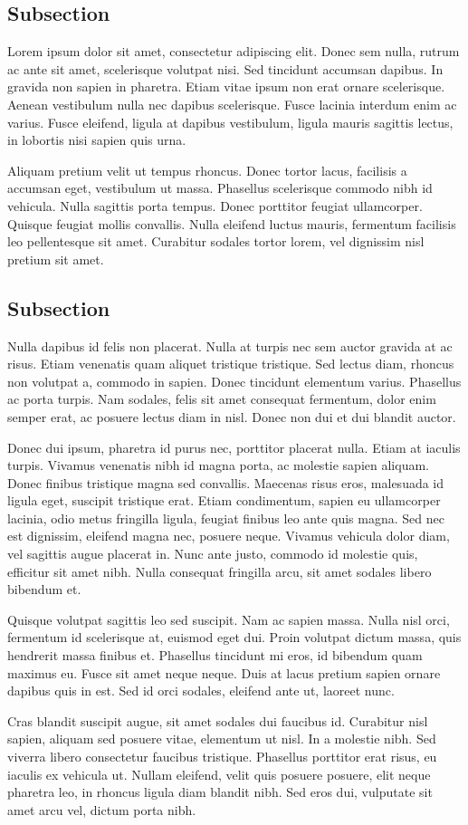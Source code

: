 \documentclass[../a5tablet.tex]{subfiles}
\begin{document}
\subsection{Subsection}
Lorem ipsum dolor sit amet, consectetur adipiscing elit.
Donec sem nulla, rutrum ac ante sit amet, scelerisque volutpat nisi.
Sed tincidunt accumsan dapibus. In gravida non sapien in pharetra. Etiam vitae ipsum non erat ornare scelerisque.
Aenean vestibulum nulla nec dapibus scelerisque. Fusce lacinia interdum enim ac varius.
Fusce eleifend, ligula at dapibus vestibulum, ligula mauris sagittis lectus, in lobortis nisi sapien quis urna.

Aliquam pretium velit ut tempus rhoncus. Donec tortor lacus, facilisis a accumsan eget, vestibulum
ut massa. Phasellus scelerisque commodo nibh id vehicula. Nulla sagittis porta tempus.
Donec porttitor feugiat ullamcorper. Quisque feugiat mollis convallis. Nulla eleifend luctus mauris,
fermentum facilisis leo pellentesque sit amet. Curabitur sodales tortor lorem,
vel dignissim nisl pretium sit amet.

\subsection{Subsection}
Nulla dapibus id felis non placerat. Nulla at turpis nec sem auctor gravida at ac risus.
Etiam venenatis quam aliquet tristique tristique. Sed lectus diam, rhoncus non volutpat a,
commodo in sapien. Donec tincidunt elementum varius. Phasellus ac porta turpis. Nam sodales,
felis sit amet consequat fermentum, dolor enim semper erat, ac posuere lectus diam in nisl.
Donec non dui et dui blandit auctor.

Donec dui ipsum, pharetra id purus nec, porttitor placerat nulla. Etiam at iaculis turpis.
Vivamus venenatis nibh id magna porta, ac molestie sapien aliquam. Donec finibus tristique magna
sed convallis. Maecenas risus eros, malesuada id ligula eget, suscipit tristique erat. Etiam
condimentum, sapien eu ullamcorper lacinia, odio metus fringilla ligula, feugiat finibus leo ante
quis magna. Sed nec est dignissim, eleifend magna nec, posuere neque. Vivamus vehicula dolor diam,
vel sagittis augue placerat in. Nunc ante justo, commodo id molestie quis, efficitur sit amet nibh.
Nulla consequat fringilla arcu, sit amet sodales libero bibendum et.

Quisque volutpat sagittis leo sed suscipit. Nam ac sapien massa. Nulla nisl orci, fermentum id
scelerisque at, euismod eget dui. Proin volutpat dictum massa, quis hendrerit massa finibus et.
Phasellus tincidunt mi eros, id bibendum quam maximus eu. Fusce sit amet neque neque. Duis at lacus
pretium sapien ornare dapibus quis in est. Sed id orci sodales, eleifend ante ut, laoreet nunc.

Cras blandit suscipit augue, sit amet sodales dui faucibus id. Curabitur nisl sapien, aliquam sed
posuere vitae, elementum ut nisl. In a molestie nibh. Sed viverra libero consectetur faucibus tristique.
Phasellus porttitor erat risus, eu iaculis ex vehicula ut. Nullam eleifend, velit quis posuere
posuere, elit neque pharetra leo, in rhoncus ligula diam blandit nibh. Sed eros dui, vulputate sit
amet arcu vel, dictum porta nibh.
\end{document}
